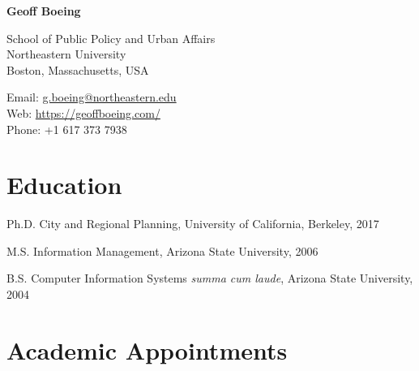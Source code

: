 \documentclass[12pt,letterpaper]{report}
\newcommand{\myname}{Geoff Boeing}
\newcommand{\namefont}[1]{{\normalfont\bfseries\Huge{#1}}}
\begin{document}
	\raggedright

	\namefont{\myname}

	\vspace{1em}
	\begin{minipage}[t]{0.495\textwidth}
		School of Public Policy and Urban Affairs \\
		Northeastern University \\
		Boston, Massachusetts, USA
	\end{minipage}
	\begin{minipage}[t]{0.495\textwidth}
		Email: \href{mailto:g.boeing@northeastern.edu}{g.boeing@northeastern.edu} \\
		Web: \href{https://geoffboeing.com/}{https://geoffboeing.com/} \\
		Phone: +1 617 373 7938
	\end{minipage}
	\vspace{0.5em}



	\section*{Education}

	\begin{tablist}

		\item[Ph.D.] \tab City and Regional Planning, University of California, Berkeley, 2017

		\item[M.S.]  \tab Information Management, Arizona State University, 2006

		\item[B.S.]  \tab Computer Information Systems \textit{summa cum laude}, Arizona State University, 2004

	\end{tablist}



	\section*{Academic Appointments}
\end{document}
